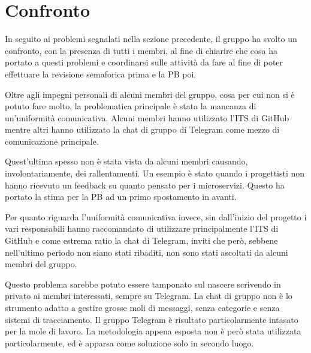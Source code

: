\section{Confronto}

In seguito ai problemi segnalati nella sezione precedente, il gruppo ha svolto un confronto, con la presenza di tutti i membri, al fine di chiarire che cosa ha portato a questi problemi e coordinarsi sulle attività da fare al fine di poter effettuare la revisione semaforica prima e la PB poi.

Oltre agli impegni personali di alcuni membri del gruppo, cosa per cui non si è potuto fare molto, la problematica principale è stata la mancanza di un'uniformità comunicativa.
Alcuni membri hanno utilizzato l'ITS di GitHub mentre altri hanno utilizzato la chat di gruppo di Telegram come mezzo di comunicazione principale.

Quest'ultima spesso non è stata vista da alcuni membri causando, involontariamente, dei rallentamenti. Un esempio è stato quando i progettisti non hanno ricevuto un feedback su quanto pensato per i microservizi. Questo ha portato la stima per la PB ad un primo spostamento in avanti.

Per quanto riguarda l'uniformità comunicativa invece, sin dall'inizio del progetto i vari responsabili hanno raccomandato di utilizzare principalmente l'ITS di GitHub e come estrema ratio la chat di Telegram, inviti che però, sebbene nell'ultimo periodo non siano stati ribaditi, non sono stati ascoltati da alcuni membri del gruppo.

Questo problema sarebbe potuto essere tamponato sul nascere scrivendo in privato ai membri interessati, sempre su Telegram. La chat di gruppo non è lo strumento adatto a gestire grosse moli di messaggi, senza categorie e senza sistemi di tracciamento. Il gruppo Telegram è risultato particolarmente intasato per la mole di lavoro.
La metodologia appena esposta non è però stata utilizzata particolarmente, ed è apparsa come soluzione solo in secondo luogo.